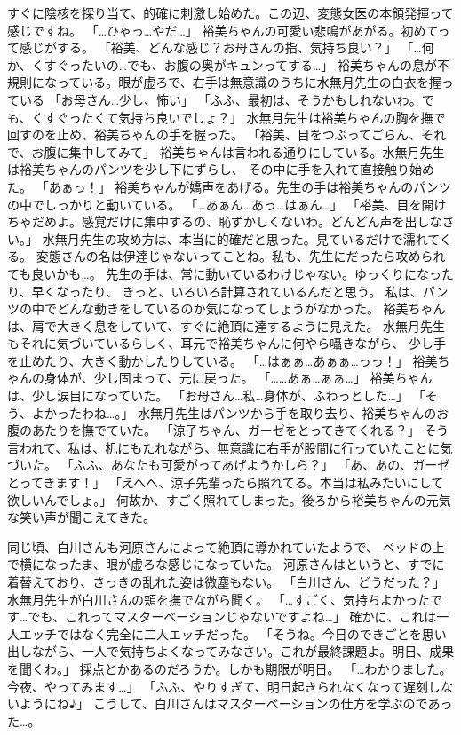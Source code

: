 すぐに陰核を探り当て、的確に刺激し始めた。この辺、変態女医の本領発揮って感じですね。
「…ひゃっ…やだ…」
裕美ちゃんの可愛い悲鳴があがる。初めてって感じがする。
「裕美、どんな感じ？お母さんの指、気持ち良い？」
「…何か、くすぐったいの…でも、お腹の奥がキュンってする…」
裕美ちゃんの息が不規則になっている。眼が虚ろで、右手は無意識のうちに水無月先生の白衣を握っている
「お母さん…少し、怖い」
「ふふ、最初は、そうかもしれないわ。でも、くすぐったくて気持ち良いでしょ？」
水無月先生は裕美ちゃんの胸を撫で回すのを止め、裕美ちゃんの手を握った。
「裕美、目をつぶってごらん、それで、お腹に集中してみて」
裕美ちゃんは言われる通りにしている。水無月先生は裕美ちゃんのパンツを少し下にずらし、
その中に手を入れて直接触り始めた。
「あぁっ！」
裕美ちゃんが嬌声をあげる。先生の手は裕美ちゃんのパンツの中でしっかりと動いている。
「…あぁん…あっ…はぁん…」
「裕美、目を開けちゃだめよ。感覚だけに集中するの、恥ずかしくないわ。どんどん声を出しなさい。」
水無月先生の攻め方は、本当に的確だと思った。見ているだけで濡れてくる。
変態さんの名は伊達じゃないってことね。私も、先生にだったら攻められても良いかも…。
先生の手は、常に動いているわけじゃない。ゆっくりになったり、早くなったり、
きっと、いろいろ計算されているんだと思う。
私は、パンツの中でどんな動きをしているのか気になってしょうがなかった。
裕美ちゃんは、肩で大きく息をしていて、すぐに絶頂に達するように見えた。
水無月先生もそれに気づいているらしく、耳元で裕美ちゃんに何やら囁きながら、
少し手を止めたり、大きく動かしたりしている。
「…はぁぁ…あぁぁ…っっ！」
裕美ちゃんの身体が、少し固まって、元に戻った。
「……あぁ…ぁぁ…」
裕美ちゃんは、少し涙目になっていた。
「お母さん…私…身体が、ふわっとした…」
「そう、よかったわね…。」
水無月先生はパンツから手を取り去り、裕美ちゃんのお腹のあたりを撫でていた。
「涼子ちゃん、ガーゼをとってきてくれる？」
そう言われて、私は、机にもたれながら、無意識に右手が股間に行っていたことに気づいた。
「ふふ、あなたも可愛がってあげようかしら？」
「あ、あの、ガーゼとってきます！」
「えへへ、涼子先輩ったら照れてる。本当は私みたいにして欲しいんでしょ。」
何故か、すごく照れてしまった。後ろから裕美ちゃんの元気な笑い声が聞こえてきた。

同じ頃、白川さんも河原さんによって絶頂に導かれていたようで、
ベッドの上で横になったま、眼が虚ろな感じになっていた。
河原さんはというと、すでに着替えており、さっきの乱れた姿は微塵もない。
「白川さん、どうだった？」
水無月先生が白川さんの頬を撫でながら聞く。
「…すごく、気持ちよかったです…でも、これってマスターベーションじゃないですよね…」
確かに、これは一人エッチではなく完全に二人エッチだった。
「そうね。今日のできごとを思い出しながら、一人で気持ちよくなってみなさい。これが最終課題よ。明日、成果を聞くわ。」
採点とかあるのだろうか。しかも期限が明日。
「…わかりました。今夜、やってみます…」
「ふふ、やりすぎて、明日起きられなくなって遅刻しないようにね♪」
こうして、白川さんはマスターベーションの仕方を学ぶのであった…。


